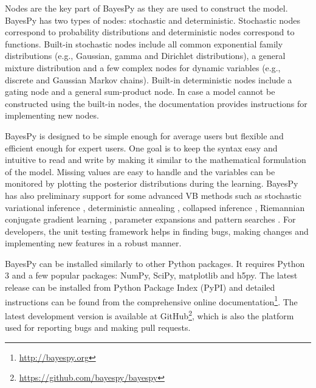 \documentclass[twoside,11pt]{article}
\begin{document}
Nodes are the key part of BayesPy as they are used to construct the model.
BayesPy has two types of nodes: stochastic and deterministic.  Stochastic nodes
correspond to probability distributions and deterministic nodes correspond to
functions.  Built-in stochastic nodes include all common exponential family
distributions (e.g., Gaussian, gamma and Dirichlet distributions), a general
mixture distribution and a few complex nodes for dynamic variables (e.g.,
discrete and Gaussian Markov chains).  Built-in deterministic nodes include a
gating node and a general sum-product node.
In case a model cannot be constructed using the built-in nodes, the
documentation provides instructions for implementing new nodes.



BayesPy is designed to be simple enough for average users but flexible and
efficient enough for expert users.  One goal is to keep the syntax easy and
intuitive to read and write by making it similar to the mathematical formulation
of the model.  Missing values are easy to handle and the variables can be
monitored by plotting the posterior distributions during the learning.  BayesPy
has also preliminary support for some advanced VB methods such as stochastic
variational inference \citep{Hoffman:2013}, deterministic annealing
\citep{Katahira:2008}, collapsed inference \citep{Hensman:2012},
Riemannian conjugate gradient learning \citep{Honkela:2010}, parameter
expansions \citep{Qi:2007} and pattern searches \citep{Honkela:2003}.  For
developers, the unit testing framework helps in finding bugs, making changes and
implementing new features in a robust manner.



BayesPy can be installed similarly to other Python packages.  It requires Python
3 and a few popular packages: NumPy, SciPy, matplotlib and h5py.  The latest
release can be installed from Python Package Index (PyPI) and detailed
instructions can be found from the comprehensive online
documentation\footnote{\url{http://bayespy.org}}.  The latest development
version is available at
GitHub\footnote{\url{https://github.com/bayespy/bayespy}}, which is also the
platform used for reporting bugs and making pull requests.




\end{document}
